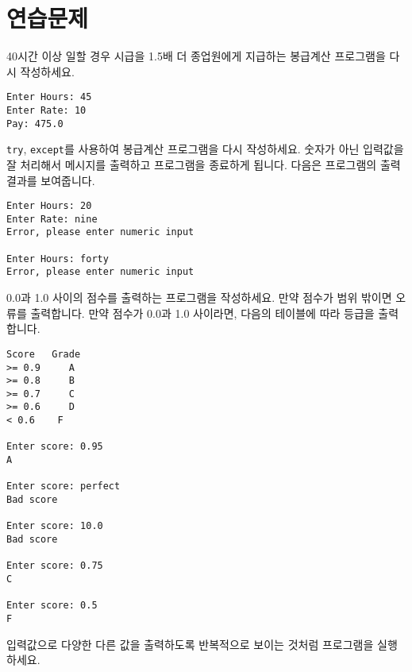 \section{연습문제}

\begin{ex}
40시간 이상 일할 경우 시급을 1.5배 더 종업원에게 지급하는 봉급계산 프로그램을 다시 작성하세요.

\begin{verbatim}
Enter Hours: 45
Enter Rate: 10
Pay: 475.0
\end{verbatim}
\end{ex}

\begin{ex}
{\tt try}, {\tt except}를 사용하여 봉급계산 프로그램을 다시 작성하세요.
숫자가 아닌 입력값을 잘 처리해서 메시지를 출력하고 프로그램을 종료하게 됩니다.
다음은 프로그램의 출력 결과를 보여줍니다.

\begin{verbatim}
Enter Hours: 20
Enter Rate: nine
Error, please enter numeric input

Enter Hours: forty
Error, please enter numeric input
\end{verbatim}
\end{ex}

\begin{ex}
0.0과 1.0 사이의 점수를 출력하는 프로그램을 작성하세요.
만약 점수가 범위 밖이면 오류를 출력합니다. 만약 점수가 0.0과 1.0 사이라면, 다음의 테이블에 따라 등급을 출력합니다.

\begin{verbatim}
Score   Grade
>= 0.9     A
>= 0.8     B
>= 0.7     C
>= 0.6     D
< 0.6    F

Enter score: 0.95
A

Enter score: perfect
Bad score

Enter score: 10.0
Bad score

Enter score: 0.75
C

Enter score: 0.5
F
\end{verbatim}
입력값으로 다양한 다른 값을 출력하도록 반복적으로 보이는 것처럼 프로그램을 실행하세요.
\end{ex}

